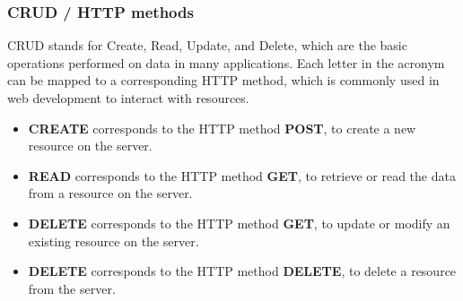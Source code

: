 \subsubsection{CRUD / HTTP methods}
CRUD stands for Create, Read, Update, and Delete, which are the basic operations performed on data in many applications. Each letter in the acronym can be mapped to a corresponding HTTP method, which is commonly used in web development to interact with resources.
\begin{itemize}
\item \textbf{CREATE} corresponds to the HTTP method \textbf{POST}, to create a new resource on the server.
\item \textbf{READ} corresponds to the HTTP method \textbf{GET}, to retrieve or read the data from a resource on the server.
\item \textbf{DELETE} corresponds to the HTTP method \textbf{GET}, to update or modify an existing resource on the server.
\item \textbf{DELETE} corresponds to the HTTP method \textbf{DELETE}, to delete a resource from the server.
\end{itemize}

